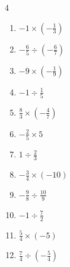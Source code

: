 \begin{multicols}{4}
\begin{enumerate}
  \item $\displaystyle -1\times{}\left(-\frac{1}{3}\right)$


  \item $\displaystyle -\frac{6}{5}\div{}\left(-\frac{6}{7}\right)$


  \item $\displaystyle -9\times{}\left(-\frac{1}{9}\right)$

        \phantom{$\displaystyle =1$}

  \item $\displaystyle -1\div{}\frac{1}{5}$

        \phantom{$\displaystyle =-5$}

  \item $\displaystyle \frac{8}{3}\times{}\left(-\frac{4}{7}\right)$


  \item $\displaystyle -\frac{2}{5}\times{}5$

        \phantom{$\displaystyle =-2$}

  \item $\displaystyle 1\div{}\frac{2}{3}$


\columnbreak %

\resetques

  \item $\displaystyle -\frac{3}{4}\times{}\left(-10\right)$


  \item $\displaystyle -\frac{9}{8}\div{}\frac{10}{9}$


  \item $\displaystyle -1\div{}\frac{7}{2}$


  \item $\displaystyle \frac{5}{4}\times{}\left(-5\right)$


  \item $\displaystyle \frac{7}{4}\div{}\left(-\frac{5}{4}\right)$


\end{enumerate}
\end{multicols}
